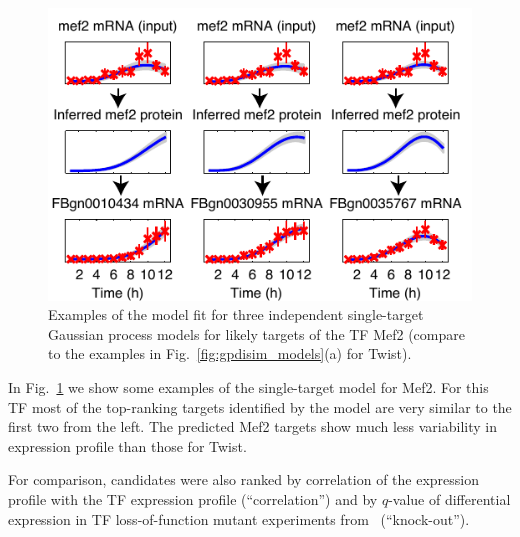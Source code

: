 \documentclass{pnastwo}
\begin{document}
\begin{article}
\begin{figure}[tb]
  \centering
  \includegraphics{dros_gpdisim_mef2_singletarget_models}
  \caption{Examples of the model fit for three independent single-target Gaussian process models for
    likely targets of the TF Mef2 (compare to the examples in Fig.~\ref{fig:gpdisim_models}(a) for Twist).\label{fig:gpdisim_mef2_models} }
\end{figure}

In Fig.~\ref{fig:gpdisim_mef2_models} we show some examples of the single-target model for Mef2.  For this TF most of the
top-ranking targets identified by the model are very similar to the first two from the left. The predicted Mef2 targets show much less variability in expression profile than those for Twist. 

For comparison, candidates were also ranked by correlation of the
expression profile with the TF expression profile (``correlation'')
and by $q$-value of differential expression in TF loss-of-function mutant
experiments from~\cite{Sandmann2006a,Sandmann2007} (``knock-out''). 




\end{article}
\end{document}
